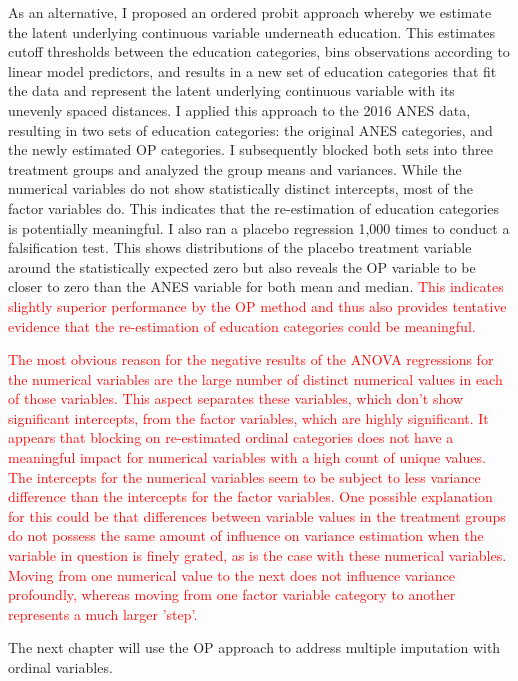 \documentclass[12pt,econ]{sources/authesis}
\begin{document}
As an alternative, I proposed an ordered probit approach whereby we estimate the latent underlying continuous variable underneath education. This estimates cutoff thresholds between the education categories, bins observations according to linear model predictors, and results in a new set of education categories that fit the data and represent the latent underlying continuous variable with its unevenly spaced distances. I applied this approach to the 2016 ANES data, resulting in two sets of education categories: the original ANES categories, and the newly estimated OP categories. I subsequently blocked both sets into three treatment groups and analyzed the group means and variances. While the numerical variables do not show statistically distinct intercepts, most of the factor variables do. This indicates that the re-estimation of education categories is potentially meaningful. I also ran a placebo regression 1,000 times to conduct a falsification test. This shows distributions of the placebo treatment variable around the statistically expected zero but also reveals the OP variable to be closer to zero than the ANES variable for both mean and median. \textcolor{red}{This indicates slightly superior performance by the OP method and thus also provides tentative evidence that the re-estimation of education categories could be meaningful.}

\textcolor{red}{The most obvious reason for the negative results of the ANOVA regressions for the numerical variables are the large number of distinct numerical values in each of those variables. This aspect separates these variables, which don't show significant intercepts, from the factor variables, which are highly significant. It appears that blocking on re-estimated ordinal categories does not have a meaningful impact for numerical variables with a high count of unique values. The intercepts for the numerical variables seem to be subject to less variance difference than the intercepts for the factor variables. One possible explanation for this could be that differences between variable values in the treatment groups do not possess the same amount of influence on variance estimation when the variable in question is finely grated, as is the case with these numerical variables. Moving from one numerical value to the next does not influence variance profoundly, whereas moving from one factor variable category to another represents a much larger 'step'.}

The next chapter will use the OP approach to address multiple imputation with ordinal variables.
\end{document}
